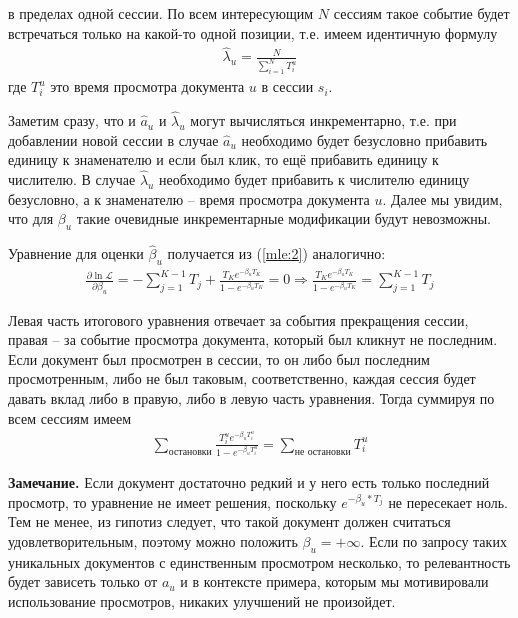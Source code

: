 \documentclass[diploma]{nanolab2015}
\begin{document}
в пределах одной сессии. По всем интересующим $N$ сессиям такое событие будет встречаться только на какой-то одной позиции, т.е. имеем идентичную формулу
\begin{align}
    \hat{\lambda}_u = \frac{N}{\sum_{i=1}^{N}T_i^u}
\end{align}
где $T_i^u$ это время просмотра документа $u$ в сессии $s_i$.

Заметим сразу, что и $\hat{a}_u$ и $\hat{\lambda}_u$ могут вычисляться инкрементарно, т.е. при добавлении новой сессии в случае $\hat{a}_u$ необходимо будет безусловно прибавить единицу к знаменателю и если был клик, то ещё прибавить единицу к числителю. В случае $\hat{\lambda}_u$ необходимо будет прибавить к числителю единицу безусловно, а к знаменателю -- время просмотра документа $u$. Далее мы увидим, что для $\beta_u$ такие очевидные инкрементарные модификации будут невозможны.

Уравнение для оценки $\hat{\beta}_u$ получается из (\ref{mle:2}) аналогично:
\begin{align}
    \frac{\partial \ln \mathcal{L}}{\partial \beta_u} = -\sum_{j=1}^{K-1} T_j + \frac{T_K e^{-\beta_u T_K}}{1 - e^{-\beta_u T_K}} = 0 \Rightarrow \frac{T_K e^{-\beta_u T_K}}{1 - e^{-\beta_u T_K}} = \sum_{j=1}^{K-1} T_j \label{grad:1}   
\end{align}

Левая часть итогового уравнения отвечает за события прекращения сессии, правая -- за событие просмотра документа, который был кликнут не последним. Если документ был просмотрен в сессии, то он либо был последним просмотренным, либо не был таковым, соответственно, каждая сессия будет давать вклад либо в правую, либо в левую часть уравнения. Тогда суммируя по всем сессиям имеем
\begin{align}
    \sum_{\text{остановки}}\frac{T_i^u e^{-\beta_u T_i^u}}{1 - e^{-\beta_u T_i^u}} = \sum_{\text{не остановки}} T_i^u
\end{align}

\textbf{Замечание.} Если документ достаточно редкий и у него есть только последний просмотр, то уравнение не имеет решения, поскольку $e^{-\beta_u * T_j}$ не пересекает ноль. Тем не менее, из гипотиз следует, что такой документ должен считаться удовлетворительным, поэтому можно положить $\beta_u = +\infty$. Если по запросу таких уникальных документов с единственным просмотром несколько, то релевантность будет зависеть только от $a_u$ и в контексте примера, которым мы мотивировали использование просмотров, никаких улучшений не произойдет.
\end{document}
